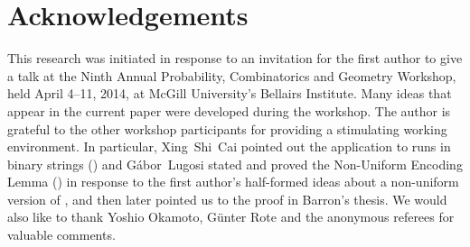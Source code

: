 \documentclass[format=acmsmall, review=false, screen=true]{acmart}
\begin{document}
\section*{Acknowledgements}

This research was initiated in response to an invitation for the first
author to give a talk at the Ninth Annual Probability, Combinatorics
and Geometry Workshop, held April 4--11, 2014, at McGill University's
Bellairs Institute.  Many ideas that appear in the current paper were
developed during the workshop. The author is grateful to the other
workshop participants for providing a stimulating working environment.
In particular, Xing~Shi~Cai pointed out the application to runs in
binary strings () and G\'abor~Lugosi stated and proved
the Non-Uniform Encoding Lemma () in response to the first
author's half-formed ideas about a non-uniform version of ,
and then later pointed us to the proof in Barron's thesis.  We would
also like to thank Yoshio Okamoto, G\"unter Rote and the 
anonymous referees for valuable comments.



\end{document}
